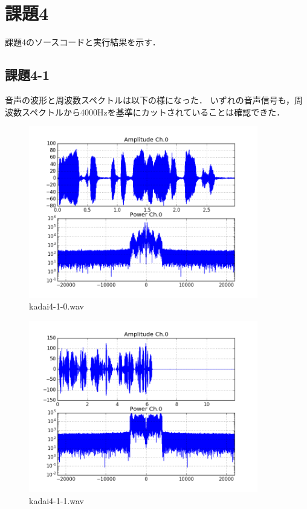\section{課題4}
課題4のソースコードと実行結果を示す．

\subsection{課題4-1}


音声の波形と周波数スペクトルは以下の様になった．
いずれの音声信号も，周波数スペクトルから4000Hzを基準にカットされていることは確認できた．

\begin{figure}[h]
  \begin{center}
    \includegraphics[width=10cm]{./img/kadai4-1-0.png}
    \caption{kadai4-1-0.wav}
  \end{center}
\end{figure}

\begin{figure}[h]
  \begin{center}
    \includegraphics[width=10cm]{./img/kadai4-1-1.png}
    \caption{kadai4-1-1.wav}
  \end{center}
\end{figure}


